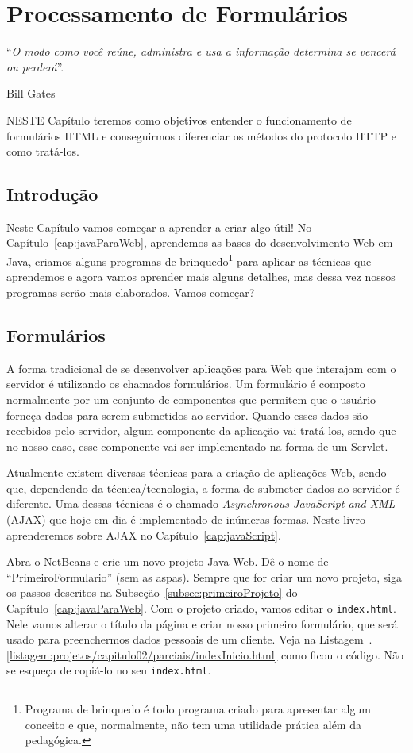 \chapter{Processamento de Formulários}\label{cap:processamentoFormularios}
\epigraph{``\textit{O modo como você reúne, administra e usa a informação determina se vencerá ou perderá}''.}{Bill Gates}

\lettrine[lines=4, lhang=0.1, lraise=0, loversize=0.2, findent=0.1em]{\textcolor{corTema}{N}}{ESTE} Capítulo teremos como objetivos entender o funcionamento de formulários HTML e conseguirmos diferenciar os métodos do protocolo HTTP e como tratá-los.


\section{Introdução}

Neste Capítulo vamos começar a aprender a criar algo útil! No Capítulo~\ref{cap:javaParaWeb}, aprendemos as bases do desenvolvimento Web em Java, criamos alguns programas de brinquedo\footnote{Programa de brinquedo é todo programa criado para apresentar algum conceito e que, normalmente, não tem uma utilidade prática além da pedagógica.} para aplicar as técnicas que aprendemos e agora vamos aprender mais alguns detalhes, mas dessa vez nossos programas serão mais elaborados. Vamos começar?


\section{Formulários}

A forma tradicional de se desenvolver aplicações para Web que interajam com o servidor é utilizando os chamados formulários. Um formulário é composto normalmente por um conjunto de componentes que permitem que o usuário forneça dados para serem submetidos ao servidor. Quando esses dados são recebidos pelo servidor, algum componente da aplicação vai tratá-los, sendo que no nosso caso, esse componente vai ser implementado na forma de um Servlet.

Atualmente existem diversas técnicas para a criação de aplicações Web, sendo que, dependendo da técnica/tecnologia, a forma de submeter dados ao servidor é diferente. Uma dessas técnicas é o chamado \textit{Asynchronous JavaScript and XML} (AJAX) que hoje em dia é implementado de inúmeras formas. Neste livro aprenderemos sobre AJAX no Capítulo~\ref{cap:javaScript}.

Abra o NetBeans e crie um novo projeto Java Web. Dê o nome de ``PrimeiroFormulario'' (sem as aspas). Sempre que for criar um novo projeto, siga os passos descritos na Subseção~\ref{subsec:primeiroProjeto} do Capítulo~\ref{cap:javaParaWeb}. Com o projeto criado, vamos editar o \texttt{index.html}. Nele vamos alterar o título da página e criar nosso primeiro formulário, que será usado para preenchermos dados pessoais de um cliente. Veja na Listagem~\thechapter.\ref{listagem:projetos/capitulo02/parciais/indexInicio.html} como ficou o código. Não se esqueça de copiá-lo no seu \texttt{index.html}.


